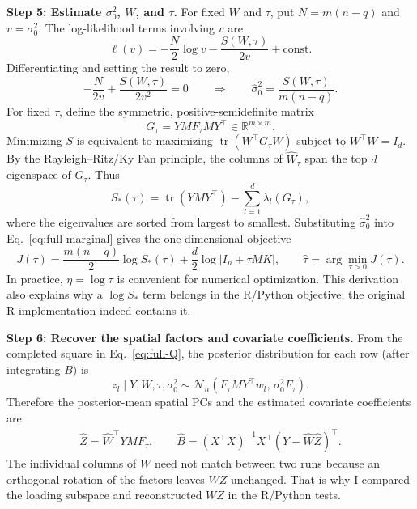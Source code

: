 \documentclass[11pt,letterpaper]{article}
\newcommand{\R}{\mathbb R}
\begin{document}
\textbf{Step 5: Estimate $\sigma_0^2$, $W$, and $\tau$.}
For fixed $W$ and $\tau$, put $N=m(n-q)$ and $v=\sigma_0^2$. The log-likelihood terms involving $v$ are
\begin{equation}
\ell(v)=-\frac N2\log v-\frac{S(W,\tau)}{2v}+\mathrm{const}.
\end{equation}
Differentiating and setting the result to zero,
\begin{equation}
-\frac{N}{2v}+\frac{S(W,\tau)}{2v^2}=0
\qquad\Longrightarrow\qquad
\boxed{\widehat\sigma_0^2=\frac{S(W,\tau)}{m(n-q)}}.
\label{eq:full-sigma}
\end{equation}
For fixed $\tau$, define the symmetric, positive-semidefinite matrix
\begin{equation}
G_\tau=YMF_\tau MY^\top\in\R^{m\times m}.
\end{equation}
Minimizing $S$ is equivalent to maximizing $\operatorname{tr}(W^\top G_\tau W)$ subject to $W^\top W=I_d$. By the Rayleigh--Ritz/Ky Fan principle, the columns of $\widehat W_\tau$ span the top $d$ eigenspace of $G_\tau$. Thus
\begin{equation}
S_*(\tau)=\operatorname{tr}(YMY^\top)-\sum_{l=1}^d\lambda_l(G_\tau),
\end{equation}
where the eigenvalues are sorted from largest to smallest. Substituting $\widehat\sigma_0^2$ into Eq.~\eqref{eq:full-marginal} gives the one-dimensional objective
\begin{equation}
\boxed{J(\tau)=\frac{m(n-q)}2\log S_*(\tau)
+\frac d2\log|I_n+\tau MK|,\qquad
\widehat\tau=\arg\min_{\tau>0}J(\tau).}
\label{eq:full-profile}
\end{equation}
In practice, $\eta=\log\tau$ is convenient for numerical optimization. This derivation also explains why a $\log S_*$ term belongs in the R/Python objective; the original R implementation indeed contains it.

\textbf{Step 6: Recover the spatial factors and covariate coefficients.}
From the completed square in Eq.~\eqref{eq:full-Q}, the posterior distribution for each row (after integrating $B$) is
\begin{equation}
z_l\mid Y,W,\tau,\sigma_0^2\sim
\mathcal N_n\!\left(F_\tau MY^\top w_l,\,\sigma_0^2F_\tau\right).
\end{equation}
Therefore the posterior-mean spatial PCs and the estimated covariate coefficients are
\begin{align}
\boxed{\widehat Z=\widehat W^\top YM F_{\widehat\tau}},\qquad
\boxed{\widehat B=(X^\top X)^{-1}X^\top
(Y-\widehat W\widehat Z)^\top}.
\label{eq:full-ZB}
\end{align}
The individual columns of $W$ need not match between two runs because an orthogonal rotation of the factors leaves $WZ$ unchanged. That is why I compared the loading subspace and reconstructed $WZ$ in the R/Python tests.
\end{document}
